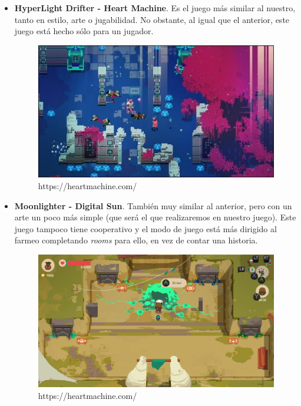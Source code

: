 \documentclass[11pt,a4paper]{article}
\begin{document}
\begin{itemize}
    \item \textbf{HyperLight Drifter - Heart Machine}. Es el juego más similar al nuestro, tanto en
    estilo, arte o jugabilidad. No obstante, al igual que el anterior, este juego está hecho sólo para
    un jugador.
    \begin{figure}[H]
        \centering
        \includegraphics[scale=0.6]{img/drifter.jpg}
        \caption{https://heartmachine.com/}
    \end{figure}

    \newpage
    \item \textbf{Moonlighter - Digital Sun}. También muy similar al anterior, pero con un arte un poco más
    simple (que será el que realizaremos en nuestro juego). Este juego tampoco tiene cooperativo y el modo de
    juego está más dirigido al farmeo completando \textit{rooms} para ello, en vez de contar una historia.
    \begin{figure}[H]
        \centering
        \includegraphics[scale=0.19]{img/moon.jpg}
        \caption{https://heartmachine.com/}
    \end{figure}

\end{itemize}
\end{document}
